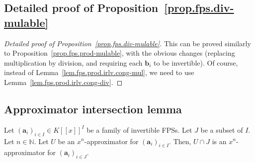 \subsection{Detailed proof of Proposition~\ref{prop.fps.div-mulable}}

\begin{proof}[Detailed proof of Proposition~\ref{prop.fps.div-mulable}]
\leanok
This can be proved similarly to Proposition~\ref{prop.fps.prod-mulable},
with the obvious changes (replacing multiplication by division, and
requiring each $\mathbf{b}_i$ to be invertible). Of course, instead of
Lemma~\ref{lem.fps.prod.irlv.cong-mul}, we need to use
Lemma~\ref{lem.fps.prod.irlv.cong-div}.
\end{proof}

\subsection{Approximator intersection lemma}

\begin{lemma}
\label{lem.fps.prods-mulable-subfams-appr}
\leantarget
\leanok
Let $\left(\mathbf{a}_{i}\right)_{i \in I} \in
K\left[\left[x\right]\right]^{I}$ be a family of invertible FPSs.
Let $J$ be a subset of $I$. Let $n \in \mathbb{N}$. Let $U$ be an
$x^n$-approximator for $\left(\mathbf{a}_{i}\right)_{i \in I}$.
Then, $U \cap J$ is an $x^n$-approximator for
$\left(\mathbf{a}_{i}\right)_{i \in J}$.
\end{lemma}

